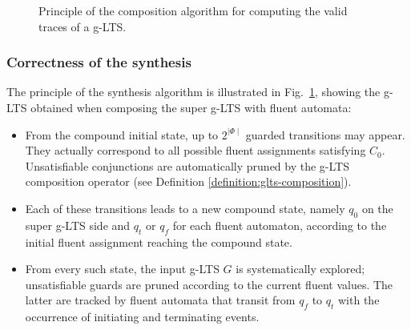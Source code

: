 \begin{figure}
\centering
{}
\caption{Principle of the composition algorithm for computing the valid traces of a g-LTS.\label{image:glts2lts-intuition}}
\end{figure}

\subsubsection*{Correctness of the synthesis}

The principle of the synthesis algorithm is illustrated in Fig.~\ref{image:glts2lts-intuition}, showing the g-LTS obtained when composing the super g-LTS with fluent automata:
\begin{itemize}
\item From the compound initial state, up to $2^{\mid\Phi\mid}$ guarded transitions may appear. They actually correspond to all possible fluent assignments satisfying $C_0$. Unsatisfiable conjunctions are automatically pruned by the g-LTS composition operator (see Definition \ref{definition:glts-composition}).
\item Each of these transitions leads to a new compound state, namely $q_0$ on the super g-LTS side and $q_t$ or $q_f$ for each fluent automaton, according to the initial fluent assignment reaching the compound state.
\item From every such state, the input g-LTS $G$ is systematically explored; unsatisfiable guards are pruned according to the current fluent values. The latter are tracked by fluent automata that transit from $q_f$ to $q_t$ with the occurrence of initiating and terminating events.
\end{itemize}

